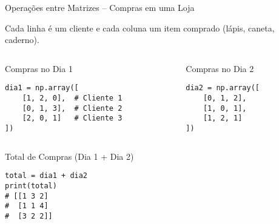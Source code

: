 \begin{frame}[fragile]{Operações entre Matrizes – Compras em uma Loja}

    Cada linha é um cliente e cada coluna um item comprado (lápis, caneta, caderno).

    \begin{columns}[T]
        \begin{column}{0.5\textwidth}
            \begin{block}{Compras no Dia 1}
                \begin{verbatim}
dia1 = np.array([
    [1, 2, 0],  # Cliente 1
    [0, 1, 3],  # Cliente 2
    [2, 0, 1]   # Cliente 3
])
\end{verbatim}
            \end{block}
        \end{column}

        \begin{column}{0.5\textwidth}
            \begin{block}{Compras no Dia 2}
                \begin{verbatim}
dia2 = np.array([
    [0, 1, 2],
    [1, 0, 1],
    [1, 2, 1]
])
\end{verbatim}
            \end{block}
        \end{column}
    \end{columns}

    \vspace{0.3cm}
    \begin{exampleblock}{Total de Compras (Dia 1 + Dia 2)}
        \begin{verbatim}
total = dia1 + dia2
print(total)
# [[1 3 2]
#  [1 1 4]
#  [3 2 2]]
\end{verbatim}
    \end{exampleblock}

\end{frame}


